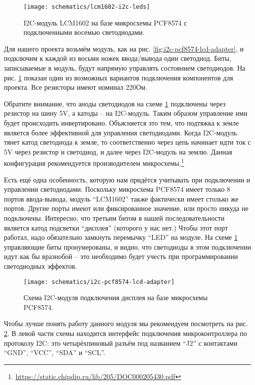 \documentclass[../sparc.tex]{subfiles}
\begin{document}
\begin{figure}[H]
  \centering
  \texttt{[image: schematics/lcm1602-i2c-leds]}
  \caption{I2C-модуль LCM1602 на базе микросхемы PCF8574 с подключенными восемью
    светодиодами.}
  \label{fig:lcm1602-i2c-leds}
\end{figure}

Для нашего проекта возьмём модуль, как на рис.
\ref{fig:i2c-pcf8574-lcd-adapter}, и подключим к каждой из восьми ножек
ввода/вывода один светодиод.  Биты, записываемые в модуль, будут напрямую
управлять состоянием светодиодов.  На рис. \ref{fig:lcm1602-i2c-leds} показан
один из возможных вариантов подключения компонентов для проекта.  Все резисторы
имеют номинал 220Ом.

Обратите внимание, что аноды светодиодов на схеме \ref{fig:lcm1602-i2c-leds}
подключены через резистор на шину 5V, а катоды -- на I2C-модуль.  Таким образом
управление ими будет происходить инвертировано.  Объясняется это тем, что
подтяжка к земле является более эффективной для управления светодиодами.  Когда
I2C-модуль тянет катод светодиода к земле, то соответственно через цепь начинает
идти ток с 5V через резистор и светодиод, и далее через I2C-модуль на землю.
Данная конфигурация рекомендуется производителем
микросхемы.\footnote{\url{https://static.chipdip.ru/lib/205/DOC000205430.pdf}}

Есть ещё одна особенность, которую нам придётся учитывать при подключении и
управлении светодиодами.  Поскольку микросхема PCF8574 имеет только 8 портов
ввода-вывода, модуль ``LCM1602'' также фактически имеет столько же портов.
Другие порты имеют или фиксированное значение, или просто никуда не подключены.
Интересно, что третьим битом в нашей последовательности является катод подсветки
``дисплея'' (которого у нас нет.)  Чтобы этот порт работал, надо обязательно
замкнуть перемычку ``LED'' на модуле.  На схеме \ref{fig:lcm1602-i2c-leds}
управляющие биты пронумерованы, и видно, что светодиоды в этом подключении идут
как бы вразнобой -- это необходимо будет учесть при программировании светодиодных
эффектов.

\begin{figure}[H]
  \centering
  \texttt{[image: schematics/i2c-pcf8574-lcd-adapter]}
  \caption{Схема I2C-модуля подключения дисплея на базе микросхемы PCF8574.}
  \label{fig:i2c-pcf8574-lcd-adapter-schematics}
\end{figure}

Чтобы лучше понять работу данного модуля мы рекомендуем посмотреть на рис.
\ref{fig:i2c-pcf8574-lcd-adapter-schematics}.  В левой части схемы находится
интерфейс подключения микроконтроллера по протоколу I2C: это четырёхпиновый
разъём под названием ``J2'' с контактами ``GND'', ``VCC'', ``SDA'' и ``SCL''.
\end{document}
